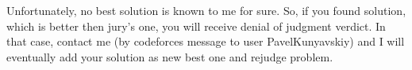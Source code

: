 Unfortunately, no best solution is known to me for sure. So, if you found solution, which is better then jury's one, you will receive denial of judgment verdict. In that case, contact me (by codeforces message to user PavelKunyavskiy) and I will eventually add your solution as new best one and rejudge problem.
